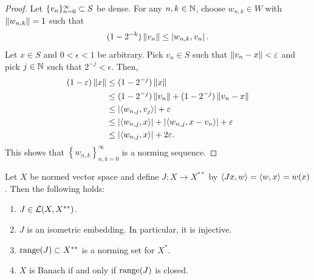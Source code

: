 \documentclass[a4paper]{article}
\begin{document}
\begin{proof}

Let $\{ v_n \}_{n=0}^\infty \subset S$ be dense.
For any $n, k \in \mathbb{N}$, choose $w_{n, k} \in W$ with
$\left\lVert w_{n, k}\right\rVert = 1$ such that
\[
(1 - 2^{-k}) \left\lVert v_n\right\rVert \leq \left\lvert w_{n, k}, v_n\right\rvert.
\]
Let $x \in S$ and $0 < \epsilon < 1$ be arbitrary.
Pick $v_n \in S$ such that $\left\lVert v_n - x\right\rVert < \varepsilon$ and
pick $j \in \mathbb{N}$ such that $2^{-j} < \epsilon$. Then,
\[
\begin{aligned}
(1 - \varepsilon) \left\lVert x\right\rVert
&\leq (1 - 2^{-j}) \left\lVert x\right\rVert  \\
&\leq (1 - 2^{-j}) \left\lVert v_n\right\rVert + (1 - 2^{-j}) \left\lVert v_n - x\right\rVert \\
&\leq \left\lvert \left\langle w_{n, j}, v_j \right\rangle\right\rvert + \varepsilon \\
&\leq \left\lvert \left\langle w_{n, j}, x \right\rangle\right\rvert + \left\lvert \left\langle w_{n, j},
x - v_n \right\rangle\right\rvert + \varepsilon \\
&\leq \left\lvert \left\langle w_{n, j}, x \right\rangle\right\rvert + 2 \varepsilon.
\end{aligned}
\]
This shows that $\left\{ w_{n, k} \right\}_{n, k = 0}^\infty$
is a norming sequence.

\end{proof}

\begin{thm}
Let $X$ be normed vector space and define $J: X \to X^{**}$
by $\left\langle Jx, w \right\rangle = \left\langle w, x \right\rangle = w(x)$. Then the following
holds:
\begin{enumerate}
\item $J \in \mathcal{L}(X, X^{**})$.
\item $J$ is an isometric embedding. In particular, it is
injective.
\item $\operatorname{range}(J) \subset X^{**}$ is a norming set for $X^*$.
\item $X$ is Banach if and only if $\operatorname{range}(J)$ is closed.
\end{enumerate}
\end{thm}
\end{document}
